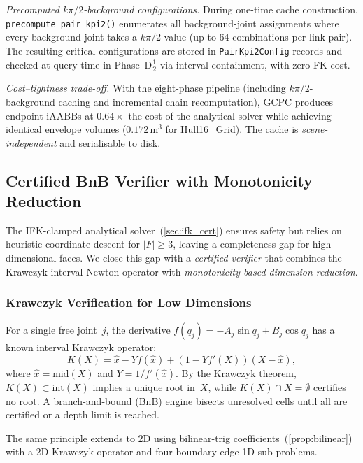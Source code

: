 \documentclass[journal]{IEEEtran}
\begin{document}
\emph{Precomputed $k\pi/2$-background configurations.}
During one-time cache construction, \texttt{precompute\_pair\_kpi2()}
enumerates all background-joint assignments where every background
joint takes a $k\pi/2$ value (up to 64 combinations per link pair).
The resulting critical configurations are stored in
\texttt{PairKpi2Config} records and checked at query time in
Phase~D$\tfrac{1}{2}$ via interval containment, with zero
FK cost.

\emph{Cost--tightness trade-off.}
With the eight-phase pipeline (including $k\pi/2$-background caching
and incremental chain recomputation),
GCPC produces endpoint-iAABBs at $0.64{\times}$ the cost of the
analytical solver while achieving identical envelope volumes
($0.172$\,m$^3$ for Hull16\_Grid).
The cache is \emph{scene-independent} and serialisable to disk.

\subsection{Certified BnB Verifier with Monotonicity Reduction}%
\label{sec:certified_verifier}

The IFK-clamped analytical solver~(\cref{sec:ifk_cert}) ensures
safety but relies on heuristic coordinate descent for $|F|\geq 3$,
leaving a completeness gap for high-dimensional faces.
We close this gap with a \emph{certified verifier} that combines
the Krawczyk interval-Newton operator with
\emph{monotonicity-based dimension reduction}.

\subsubsection{Krawczyk Verification for Low Dimensions}

For a single free joint~$j$, the derivative
$f(q_j) = -A_j\sin q_j + B_j\cos q_j$
has a known interval Krawczyk operator:
\begin{equation}\label{eq:krawczyk1d}
  K(X) = \hat x - Y f(\hat x) + (1 - Y f'(X))(X - \hat x),
\end{equation}
where $\hat x = \text{mid}(X)$ and $Y = 1/f'(\hat x)$.
By the Krawczyk theorem, $K(X) \subset \text{int}(X)$
implies a unique root in~$X$, while $K(X) \cap X = \emptyset$
certifies no root.
A branch-and-bound (BnB) engine bisects unresolved cells
until all are certified or a depth limit is reached.

The same principle extends to 2D using bilinear-trig
coefficients~(\cref{prop:bilinear}) with a 2D Krawczyk operator
and four boundary-edge 1D sub-problems.
\end{document}
